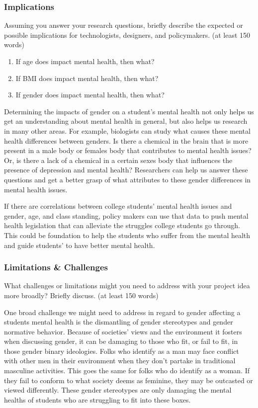 \documentclass[
]{article}
\providecommand{\tightlist}{%
  \setlength{\itemsep}{0pt}\setlength{\parskip}{0pt}}
\begin{document}
\hypertarget{implications}{%
\subsubsection{Implications}\label{implications}}

Assuming you answer your research questions, briefly describe the
expected or possible implications for technologists, designers, and
policymakers. (at least 150 words)

\begin{enumerate}
\def\labelenumi{\arabic{enumi})}
\tightlist
\item
  If age does impact mental health, then what?
\item
  If BMI does impact mental health, then what?
\item
  If gender does impact mental health, then what?
\end{enumerate}

Determining the impacts of gender on a student's mental health not only
helps us get an understanding about mental health in general, but also
helps us research in many other areas. For example, biologists can study
what causes these mental health differences between genders. Is there a
chemical in the brain that is more present in a male body or females
body that contributes to mental health issues? Or, is there a lack of a
chemical in a certain sexes body that influences the presence of
depression and mental health? Researchers can help us answer these
questions and get a better grasp of what attributes to these gender
differences in mental health issues.

If there are correlations between college students' mental health issues
and gender, age, and class standing, policy makers can use that data to
push mental health legislation that can alleviate the struggles college
students go through. This could be foundation to help the students who
suffer from the mental health and guide students' to have better mental
health.

\hypertarget{limitations-challenges}{%
\subsubsection{Limitations \& Challenges}\label{limitations-challenges}}

What challenges or limitations might you need to address with your
project idea more broadly? Briefly discuss. (at least 150 words)

One broad challenge we might need to address in regard to gender
affecting a students mental health is the dismantling of gender
stereotypes and gender normative behavior. Because of societies' views
and the environment it fosters when discussing gender, it can be
damaging to those who fit, or fail to fit, in those gender binary
ideologies. Folks who identify as a man may face conflict with other men
in their environment when they don't partake in traditional masculine
activities. This goes the same for folks who do identify as a woman. If
they fail to conform to what society deems as feminine, they may be
outcasted or viewed differently. These gender stereotypes are only
damaging the mental healths of students who are struggling to fit into
these boxes.
\end{document}

